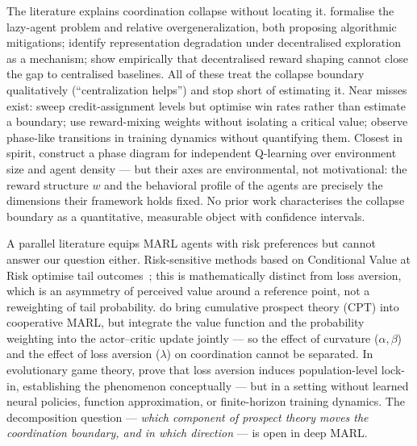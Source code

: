 \documentclass[11pt]{article}
\begin{document}
The literature explains coordination collapse without locating it.
\citet{liu2023lazy} formalise the lazy-agent problem and
\citet{peng2023curo} relative overgeneralization, both proposing
algorithmic mitigations; \citet{weng2026} identify representation
degradation under decentralised exploration as a mechanism;
\citet{dmarl2025} show empirically that decentralised reward shaping
cannot close the gap to centralised baselines.
All of these treat the collapse boundary qualitatively
(``centralization helps'') and stop short of estimating it.
Near misses exist: \citet{wang2025maca} sweep credit-assignment levels
but optimise win rates rather than estimate a boundary;
\citet{jiang2018dgn} use reward-mixing weights without isolating a
critical value; \citet{zhang2026lcerd} observe phase-like transitions in
training dynamics without quantifying them.
Closest in spirit, \citet{yamaguchi2025} construct a phase diagram for
independent Q-learning over environment size and agent density --- but
their axes are environmental, not motivational: the reward structure $w$
and the behavioral profile of the agents are precisely the dimensions
their framework holds fixed.
No prior work characterises the collapse boundary as a quantitative,
measurable object with confidence intervals.

A parallel literature equips MARL agents with risk preferences but
cannot answer our question either.
Risk-sensitive methods based on Conditional Value at Risk optimise tail
outcomes~\citep{qiu2021rmix,xie2023riskq}; this is mathematically
distinct from loss aversion, which is an asymmetry of perceived value
around a reference point, not a reweighting of tail probability.
\citet{lalmohammed2025} do bring cumulative prospect theory (CPT) into
cooperative MARL, but integrate the value function and the probability
weighting into the actor--critic update jointly --- so the effect of
curvature ($\alpha,\beta$) and the effect of loss aversion ($\lambda$)
on coordination cannot be separated.
In evolutionary game theory, \citet{mengesha2026} prove that loss
aversion induces population-level lock-in, establishing the phenomenon
conceptually --- but in a setting without learned neural policies,
function approximation, or finite-horizon training dynamics.
The decomposition question --- \emph{which component of prospect theory
moves the coordination boundary, and in which direction} --- is open in
deep MARL.
\end{document}
